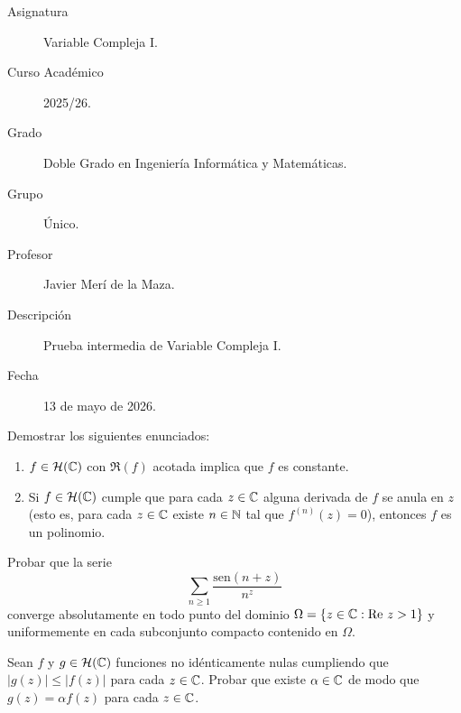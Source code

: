 \documentclass[12pt]{article}
\begin{document}

    
    

    \begin{description}
        \item[Asignatura] Variable Compleja I.
        \item[Curso Académico] 2025/26.
        \item[Grado] Doble Grado en Ingeniería Informática y Matemáticas.
        \item[Grupo] Único.
        \item[Profesor] Javier Merí de la Maza.
        \item[Descripción] Prueba intermedia de Variable Compleja I.
        \item[Fecha] 13 de mayo de 2026.
    \end{description}
    \newpage


    
    \begin{ejercicio}[4 puntos]
        Demostrar los siguientes enunciados:
        \begin{enumerate}[label=\alph*)]
            \item $f \in \mathcal{H}(\mathbb{C})$ con $\Re(f)$ acotada implica que $f$ es constante.
            \item Si $f \in \mathcal{H}(\mathbb{C})$ cumple que para cada $z \in \mathbb{C}$ alguna derivada de $f$ se anula en $z$ (esto es, para cada $z \in \mathbb{C}$ existe $n \in \mathbb{N}$ tal que $f^{(n)}(z) = 0$), entonces $f$ es un polinomio.
        \end{enumerate}
    \end{ejercicio}

    \begin{ejercicio}[3 puntos]
        Probar que la serie 
        \[ \sum_{n \geq 1} \frac{\text{sen}(n + z)}{n^z} \]
        converge absolutamente en todo punto del dominio $\Omega = \{z \in \mathbb{C} : \text{Re } z > 1\}$ y uniformemente en cada subconjunto compacto contenido en $\Omega$.
    \end{ejercicio}

    \begin{ejercicio}[3 puntos]
        Sean $f$ y $g \in \mathcal{H}(\mathbb{C})$ funciones no idénticamente nulas cumpliendo que $|g(z)| \leq |f(z)|$ para cada $z \in \mathbb{C}$. Probar que existe $\alpha \in \mathbb{C}$ de modo que $g(z) = \alpha f(z)$ para cada $z \in \mathbb{C}$.
    \end{ejercicio}

    \newpage
    \setcounter{ejercicio}{0} %
    \noindent
\end{document}
